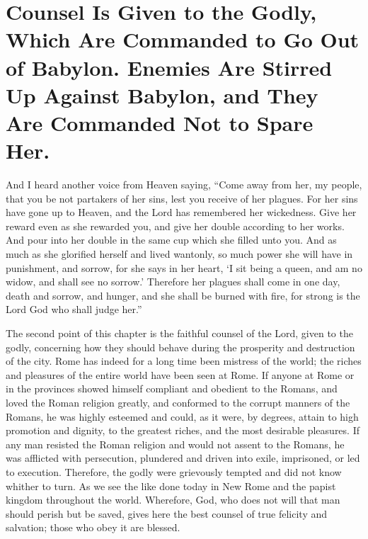 \chapter[Sermon 78. Counsel Is Given to the Godly, Which Are Commanded to Go Out of Babylon. Enemies Are Stirred Up Against Babylon, and They Are Commanded Not to Spare Her.]{Counsel Is Given to the Godly, Which Are Commanded to Go Out of Babylon. Enemies Are Stirred Up Against Babylon, and They Are Commanded Not to Spare Her.}
\label{sermon:078}

And I heard another voice from Heaven saying, “Come away from her, my people, that you be not partakers of her sins, lest you receive of her plagues. For her sins have gone up to Heaven, and the Lord has remembered her wickedness. Give her reward even as she rewarded you, and give her double according to her works. And pour into her double in the same cup which she filled unto you. And as much as she glorified herself and lived wantonly, so much power she will have in punishment, and sorrow, for she says in her heart, ‘I sit being a queen, and am no widow, and shall see no sorrow.’ Therefore her plagues shall come in one day, death and sorrow, and hunger, and she shall be burned with fire, for strong is the Lord God who shall judge her.”

The second point of this chapter is the faithful counsel of the Lord, given to the godly, concerning how they should behave during the prosperity and destruction of the city. Rome has indeed for a long time been mistress of the world; the riches and pleasures of the entire world have been seen at Rome. If anyone at Rome or in the provinces showed himself compliant and obedient to the Romans, and loved the Roman religion greatly, and conformed to the corrupt manners of the Romans, he was highly esteemed and could, as it were, by degrees, attain to high promotion and dignity, to the greatest riches, and the most desirable pleasures. If any man resisted the Roman religion and would not assent to the Romans, he was afflicted with persecution, plundered and driven into exile, imprisoned, or led to execution. Therefore, the godly were grievously tempted and did not know whither to turn. As we see the like done today in New Rome and the papist kingdom throughout the world. Wherefore, God, who does not will that man should perish but be saved, gives here the best counsel of true felicity and salvation; those who obey it are blessed.

